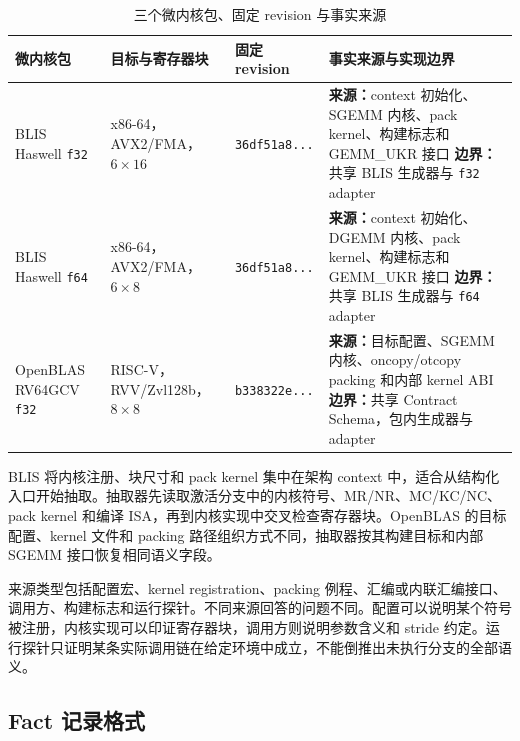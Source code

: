 \begin{table}[!htbp]
  \centering
  \caption{三个微内核包、固定 revision 与事实来源}
  \label{tab:chapter3-packages}
  \begingroup
  \begin{tabularx}{\textwidth}{
    @{}
    >{\raggedright\arraybackslash}p{}
    >{\raggedright\arraybackslash}p{}
    >{\raggedright\arraybackslash}p{}
    >{\raggedright\arraybackslash}X
    @{}
  }
    \toprule
    \textbf{微内核包} & \textbf{目标与寄存器块} & \textbf{固定 revision} &
    \textbf{事实来源与实现边界} \\
    \midrule
    BLIS Haswell \texttt{f32} &
    x86-64，AVX2/FMA，$6\times16$ &
    \texttt{36df51a8...} &
    \textbf{来源：}context 初始化、SGEMM 内核、pack kernel、构建标志和 GEMM\_UKR 接口
    \newline \textbf{边界：}共享 BLIS 生成器与 \texttt{f32} adapter \\
    BLIS Haswell \texttt{f64} &
    x86-64，AVX2/FMA，$6\times8$ &
    \texttt{36df51a8...} &
    \textbf{来源：}context 初始化、DGEMM 内核、pack kernel、构建标志和 GEMM\_UKR 接口
    \newline \textbf{边界：}共享 BLIS 生成器与 \texttt{f64} adapter \\
    OpenBLAS RV64GCV \texttt{f32} &
    RISC-V，RVV/Zvl128b，$8\times8$ &
    \texttt{b338322e...} &
    \textbf{来源：}目标配置、SGEMM 内核、oncopy/otcopy packing 和内部 kernel ABI
    \newline \textbf{边界：}共享 Contract Schema，包内生成器与 adapter \\
    \bottomrule
  \end{tabularx}
  \endgroup
\end{table}

BLIS 将内核注册、块尺寸和 pack kernel 集中在架构 context 中，适合从结构化入口开始抽取\cite{VanZee2015BLIS}。抽取器先读取激活分支中的内核符号、MR/NR、MC/KC/NC、pack kernel 和编译 ISA，再到内核实现中交叉检查寄存器块。OpenBLAS 的目标配置、kernel 文件和 packing 路径组织方式不同，抽取器按其构建目标和内部 SGEMM 接口恢复相同语义字段\cite{OpenMathLibOpenBLAS}。

来源类型包括配置宏、kernel registration、packing 例程、汇编或内联汇编接口、调用方、构建标志和运行探针。不同来源回答的问题不同。配置可以说明某个符号被注册，内核实现可以印证寄存器块，调用方则说明参数含义和 stride 约定。运行探针只证明某条实际调用链在给定环境中成立，不能倒推出未执行分支的全部语义。

\subsection{Fact 记录格式}

